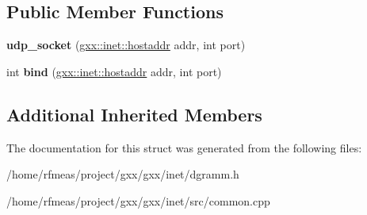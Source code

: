 \subsection*{Public Member Functions}
\begin{DoxyCompactItemize}
\item 
{\bfseries udp\+\_\+socket} (\hyperlink{classgxx_1_1hostaddr}{gxx\+::inet\+::hostaddr} addr, int port)\hypertarget{structgxx_1_1inet_1_1udp__socket_af36718f133587add035f70beb0ae7f66}{}\label{structgxx_1_1inet_1_1udp__socket_af36718f133587add035f70beb0ae7f66}

\item 
int {\bfseries bind} (\hyperlink{classgxx_1_1hostaddr}{gxx\+::inet\+::hostaddr} addr, int port)\hypertarget{structgxx_1_1inet_1_1udp__socket_ae8b085d7b100fd29c2c2fd6b598ba3ed}{}\label{structgxx_1_1inet_1_1udp__socket_ae8b085d7b100fd29c2c2fd6b598ba3ed}

\end{DoxyCompactItemize}
\subsection*{Additional Inherited Members}


The documentation for this struct was generated from the following files\+:\begin{DoxyCompactItemize}
\item 
/home/rfmeas/project/gxx/gxx/inet/dgramm.\+h\item 
/home/rfmeas/project/gxx/gxx/inet/src/common.\+cpp\end{DoxyCompactItemize}
